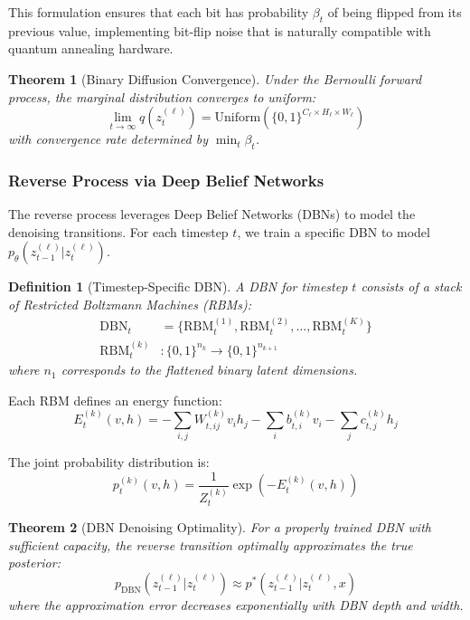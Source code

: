\documentclass{article}
\newtheorem{theorem}{Theorem}
\newtheorem{definition}{Definition}
\begin{document}
This formulation ensures that each bit has probability $\beta_t$ of being flipped from its previous value, implementing bit-flip noise that is naturally compatible with quantum annealing hardware.

\begin{theorem}[Binary Diffusion Convergence]
Under the Bernoulli forward process, the marginal distribution converges to uniform:
\begin{equation}
\lim_{t \rightarrow \infty} q(z_t^{(\ell)}) = \text{Uniform}(\{0,1\}^{C_\ell \times H_\ell \times W_\ell})
\end{equation}
with convergence rate determined by $\min_t \beta_t$.
\end{theorem}

\subsubsection{Reverse Process via Deep Belief Networks}

The reverse process leverages Deep Belief Networks (DBNs) to model the denoising transitions. For each timestep $t$, we train a specific DBN to model $p_\theta(z_{t-1}^{(\ell)} | z_t^{(\ell)})$.

\begin{definition}[Timestep-Specific DBN]
A DBN for timestep $t$ consists of a stack of Restricted Boltzmann Machines (RBMs):
\begin{align}
\text{DBN}_t &= \{\text{RBM}_t^{(1)}, \text{RBM}_t^{(2)}, \ldots, \text{RBM}_t^{(K)}\}\\
\text{RBM}_t^{(k)} &: \{0,1\}^{n_k} \rightarrow \{0,1\}^{n_{k+1}}
\end{align}
where $n_1$ corresponds to the flattened binary latent dimensions.
\end{definition}

Each RBM defines an energy function:
\begin{equation}
E_t^{(k)}(v, h) = -\sum_{i,j} W_{t,ij}^{(k)} v_i h_j - \sum_i b_{t,i}^{(k)} v_i - \sum_j c_{t,j}^{(k)} h_j
\end{equation}

The joint probability distribution is:
\begin{equation}
p_t^{(k)}(v, h) = \frac{1}{Z_t^{(k)}} \exp(-E_t^{(k)}(v, h))
\end{equation}

\begin{theorem}[DBN Denoising Optimality]
For a properly trained DBN with sufficient capacity, the reverse transition optimally approximates the true posterior:
\begin{equation}
p_{\text{DBN}}(z_{t-1}^{(\ell)} | z_t^{(\ell)}) \approx p^*(z_{t-1}^{(\ell)} | z_t^{(\ell)}, x)
\end{equation}
where the approximation error decreases exponentially with DBN depth and width.
\end{theorem}
\end{document}
